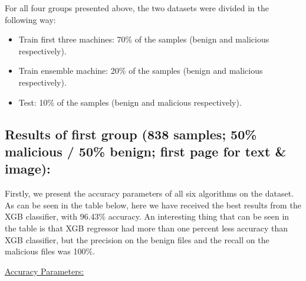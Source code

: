 \documentclass{article}
\begin{document}
\indent For all four groups presented above, the two datasets were divided in the following way:
\renewcommand{\labelitemi}{$\textendash$}
\begin{itemize}
    \item Train first three machines: 70\% of the samples (benign and malicious respectively).
    \item Train ensemble machine: 20\% of the samples (benign and malicious respectively).
	\item Test: 10\% of the samples (benign and malicious respectively).
\end{itemize}

\subsection{Results of first group (838 samples; 50\% malicious / 50\% benign; first page for text \& image):}
\indent Firstly, we present the accuracy parameters of all six algorithms on the dataset. As can be seen in the table below, here we have received the best results from the XGB classifier, with 96.43\% accuracy. An interesting thing that can be seen in the table is that XGB regressor had more than one percent less accuracy than XGB classifier, but the precision on the benign files and the recall on the malicious files was 100\%.

\noindent\underline{Accuracy Parameters:}
\end{document}
